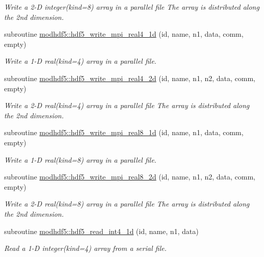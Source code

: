 \begin{DoxyCompactItemize}
\begin{DoxyCompactList}\small\item\em Write a 2-\/D integer(kind=8) array in a parallel file The array is distributed along the 2nd dimension. \end{DoxyCompactList}\item 
subroutine \hyperlink{namespacemodhdf5_aa5b200799b385418068f6c916bbbad34}{modhdf5\+::hdf5\+\_\+write\+\_\+mpi\+\_\+real4\+\_\+1d} (id, name, n1, data, comm, empty)
\begin{DoxyCompactList}\small\item\em Write a 1-\/D real(kind=4) array in a parallel file. \end{DoxyCompactList}\item 
subroutine \hyperlink{namespacemodhdf5_a6c880adf75b8b8a5ad56120effed2f6a}{modhdf5\+::hdf5\+\_\+write\+\_\+mpi\+\_\+real4\+\_\+2d} (id, name, n1, n2, data, comm, empty)
\begin{DoxyCompactList}\small\item\em Write a 2-\/D real(kind=4) array in a parallel file The array is distributed along the 2nd dimension. \end{DoxyCompactList}\item 
subroutine \hyperlink{namespacemodhdf5_a6fe25705d9c64cf43c06c885a71878e2}{modhdf5\+::hdf5\+\_\+write\+\_\+mpi\+\_\+real8\+\_\+1d} (id, name, n1, data, comm, empty)
\begin{DoxyCompactList}\small\item\em Write a 1-\/D real(kind=8) array in a parallel file. \end{DoxyCompactList}\item 
subroutine \hyperlink{namespacemodhdf5_a670313739a46ec4d9006d8761d35157a}{modhdf5\+::hdf5\+\_\+write\+\_\+mpi\+\_\+real8\+\_\+2d} (id, name, n1, n2, data, comm, empty)
\begin{DoxyCompactList}\small\item\em Write a 2-\/D real(kind=8) array in a parallel file The array is distributed along the 2nd dimension. \end{DoxyCompactList}\item 
subroutine \hyperlink{namespacemodhdf5_afda2e44922def0d140ce850c12ef2f48}{modhdf5\+::hdf5\+\_\+read\+\_\+int4\+\_\+1d} (id, name, n1, data)
\begin{DoxyCompactList}\small\item\em Read a 1-\/D integer(kind=4) array from a serial file. \end{DoxyCompactList}\item 

\end{DoxyCompactItemize}
